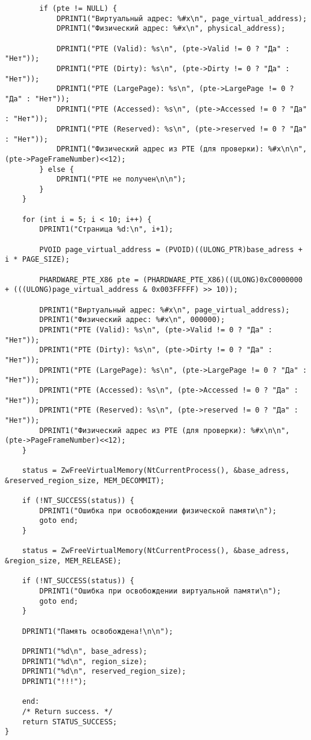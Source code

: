 \documentclass[a4paper, 14pt]{extarticle}
\begin{document}
\begin{verbatim}
        if (pte != NULL) {
            DPRINT1("Виртуальный адрес: %#x\n", page_virtual_address);
            DPRINT1("Физический адрес: %#x\n", physical_address);

            DPRINT1("PTE (Valid): %s\n", (pte->Valid != 0 ? "Да" : "Нет"));
            DPRINT1("PTE (Dirty): %s\n", (pte->Dirty != 0 ? "Да" : "Нет"));
            DPRINT1("PTE (LargePage): %s\n", (pte->LargePage != 0 ? "Да" : "Нет"));
            DPRINT1("PTE (Accessed): %s\n", (pte->Accessed != 0 ? "Да" : "Нет"));
            DPRINT1("PTE (Reserved): %s\n", (pte->reserved != 0 ? "Да" : "Нет"));
            DPRINT1("Физический адрес из PTE (для проверки): %#x\n\n", (pte->PageFrameNumber)<<12);
        } else {
            DPRINT1("PTE не получен\n\n");
        }
    }

    for (int i = 5; i < 10; i++) {
        DPRINT1("Страница %d:\n", i+1);

        PVOID page_virtual_address = (PVOID)((ULONG_PTR)base_adress + i * PAGE_SIZE);

        PHARDWARE_PTE_X86 pte = (PHARDWARE_PTE_X86)((ULONG)0xC0000000 + (((ULONG)page_virtual_address & 0x003FFFFF) >> 10));

        DPRINT1("Виртуальный адрес: %#x\n", page_virtual_address);
        DPRINT1("Физический адрес: %#x\n", 000000);
        DPRINT1("PTE (Valid): %s\n", (pte->Valid != 0 ? "Да" : "Нет"));
        DPRINT1("PTE (Dirty): %s\n", (pte->Dirty != 0 ? "Да" : "Нет"));
        DPRINT1("PTE (LargePage): %s\n", (pte->LargePage != 0 ? "Да" : "Нет"));
        DPRINT1("PTE (Accessed): %s\n", (pte->Accessed != 0 ? "Да" : "Нет"));
        DPRINT1("PTE (Reserved): %s\n", (pte->reserved != 0 ? "Да" : "Нет"));
        DPRINT1("Физический адрес из PTE (для проверки): %#x\n\n", (pte->PageFrameNumber)<<12);
    }

    status = ZwFreeVirtualMemory(NtCurrentProcess(), &base_adress, &reserved_region_size, MEM_DECOMMIT);

    if (!NT_SUCCESS(status)) {
        DPRINT1("Ошибка при освобождении физической памяти\n");
        goto end;
    }

    status = ZwFreeVirtualMemory(NtCurrentProcess(), &base_adress, &region_size, MEM_RELEASE);

    if (!NT_SUCCESS(status)) {
        DPRINT1("Ошибка при освобождении виртуальной памяти\n");
        goto end;
    }

    DPRINT1("Память освобождена!\n\n");

    DPRINT1("%d\n", base_adress);
    DPRINT1("%d\n", region_size);
    DPRINT1("%d\n", reserved_region_size);
    DPRINT1("!!!");

    end:
    /* Return success. */
    return STATUS_SUCCESS;
}

\end{verbatim}
\end{document}
